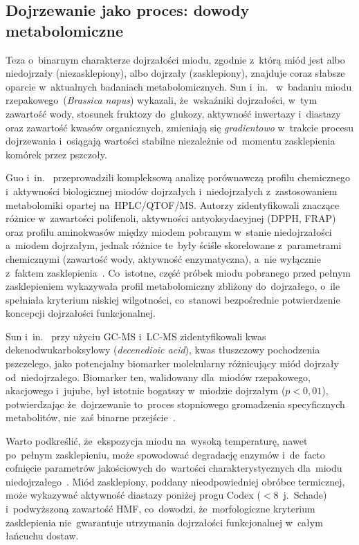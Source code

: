 \subsection{Dojrzewanie jako proces: dowody metabolomiczne}

Teza o~binarnym charakterze dojrzałości miodu, zgodnie z~którą
miód jest albo niedojrzały (niezasklepiony), albo dojrzały
(zasklepiony), znajduje coraz słabsze oparcie w~aktualnych
badaniach metabolomicznych. Sun i~in.~\cite{sun2021} w~badaniu
miodu rzepakowego~(\textit{Brassica napus}) wykazali, że~wskaźniki
dojrzałości, w~tym zawartość wody, stosunek fruktozy do~glukozy,
aktywność inwertazy i~diastazy oraz zawartość kwasów organicznych, zmieniają się \emph{gradientowo} w~trakcie procesu dojrzewania i~osiągają wartości stabilne niezależnie od~momentu zasklepienia
komórek przez pszczoły.

Guo i~in.~\cite{guo2020} przeprowadzili kompleksową analizę porównawczą profilu chemicznego i~aktywności biologicznej miodów dojrzałych i~niedojrzałych z~zastosowaniem metabolomiki opartej na~HPLC/QTOF/MS. Autorzy zidentyfikowali znaczące różnice w~zawartości polifenoli, aktywności antyoksydacyjnej (DPPH, FRAP) oraz profilu aminokwasów między miodem pobranym w~stanie niedojrzałości a~miodem dojrzałym, jednak różnice te~były ściśle skorelowane z~parametrami chemicznymi (zawartość wody, aktywność enzymatyczna), a~nie
wyłącznie z~faktem zasklepienia~\cite{guo2020}. Co~istotne, część próbek miodu pobranego przed pełnym zasklepieniem wykazywała profil metabolomiczny zbliżony do~dojrzałego, o~ile spełniała kryterium
niskiej wilgotności, co~stanowi bezpośrednie potwierdzenie koncepcji
dojrzałości funkcjonalnej. 

Sun i~in.~\cite{sun2021} przy użyciu GC-MS i~LC-MS zidentyfikowali
kwas dekenodwukarboksylowy (\textit{decenedioic acid}), kwas
tłuszczowy pochodzenia pszczelego, jako potencjalny biomarker
molekularny różnicujący miód dojrzały od~niedojrzałego. Biomarker
ten, walidowany dla~miodów rzepakowego, akacjowego i~jujube, był
istotnie bogatszy w~miodzie dojrzałym ($p < 0{,}01$), potwierdzając
że~dojrzewanie to~proces stopniowego gromadzenia specyficznych
metabolitów, nie~zaś binarne przejście~\cite{sun2021}.

Warto podkreślić, że~ekspozycja miodu na~wysoką temperaturę,
nawet po~pełnym zasklepieniu, może spowodować degradację enzymów
i~de~facto cofnięcie parametrów jakościowych do~wartości
charakterystycznych dla~miodu niedojrzałego~\cite{biochemreactions2022}.
Miód zasklepiony, poddany nieodpowiedniej obróbce termicznej,
może wykazywać aktywność diastazy poniżej progu Codex ($< 8$~j.~Schade)
i~podwyższoną zawartość HMF, co~dowodzi, że~morfologiczne kryterium
zasklepienia nie~gwarantuje utrzymania dojrzałości funkcjonalnej
w~całym łańcuchu dostaw.

